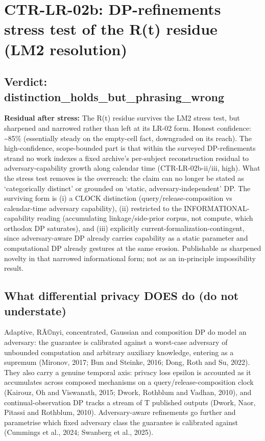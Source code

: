 \documentclass[
  11pt,
]{article}
\begin{document}
\newpage

\section{CTR-LR-02b: DP-refinements stress test of the R(t) residue (LM2
resolution)}\label{ctr-lr-02b-dp-refinements-stress-test-of-the-rt-residue-lm2-resolution}

\subsection{Verdict:
distinction\_holds\_but\_phrasing\_wrong}\label{verdict-distinction_holds_but_phrasing_wrong}

\textbf{Residual after stress:} The R(t) residue survives the LM2 stress
test, but sharpened and narrowed rather than left at its LR-02 form.
Honest confidence: \textasciitilde85\% (essentially steady on the
empty-cell fact, downgraded on its reach). The high-confidence,
scope-bounded part is that within the surveyed DP-refinements strand no
work indexes a fixed archive's per-subject reconstruction residual to
adversary-capability growth along calendar time (CTR-LR-02b-ii/iii,
high). What the stress test removes is the overreach: the claim can no
longer be stated as `categorically distinct' or grounded on `static,
adversary-independent' DP. The surviving form is (i) a CLOCK distinction
(query/release-composition vs calendar-time adversary capability), (ii)
restricted to the INFORMATIONAL-capability reading (accumulating
linkage/side-prior corpus, not compute, which orthodox DP saturates),
and (iii) explicitly current-formalization-contingent, since
adversary-aware DP already carries capability as a static parameter and
computational DP already gestures at the same erosion. Publishable as
sharpened novelty in that narrowed informational form; not as an
in-principle impossibility result.

\subsection{What differential privacy DOES do (do not
understate)}\label{what-differential-privacy-does-do-do-not-understate}

Adaptive, RÃ©nyi, concentrated, Gaussian and composition DP do model an
adversary: the guarantee is calibrated against a worst-case adversary of
unbounded computation and arbitrary auxiliary knowledge, entering as a
supremum (Mironov, 2017; Bun and Steinke, 2016; Dong, Roth and Su,
2022). They also carry a genuine temporal axis: privacy loss epsilon is
accounted as it accumulates across composed mechanisms on a
query/release-composition clock (Kairouz, Oh and Viswanath, 2015; Dwork,
Rothblum and Vadhan, 2010), and continual-observation DP tracks a stream
of T published outputs (Dwork, Naor, Pitassi and Rothblum, 2010).
Adversary-aware refinements go further and parametrise which fixed
adversary class the guarantee is calibrated against (Cummings et al.,
2024; Swanberg et al., 2025).
\end{document}

